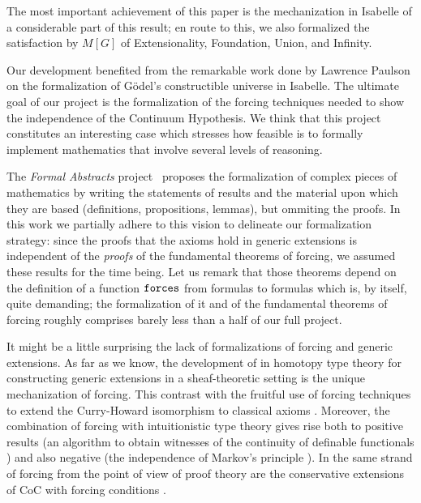\medskip
{}
\medskip

The most important achievement of this paper is the
mechanization in Isabelle of a considerable part of this result; en route
to this, we also formalized the satisfaction by $M[G]$ of
Extensionality, Foundation, Union, and Infinity. %

\medskip
{}
\medskip

Our development benefited from the remarkable work done by Lawrence
Paulson \cite{paulson_2003} on the formalization of G\"odel's
constructible universe in Isabelle. The
ultimate goal of our project is the formalization of the forcing
techniques needed to show the independence of the Continuum
Hypothesis. We think that this project constitutes an interesting case
which stresses how feasible is to formally implement mathematics that
involve several levels of reasoning. 

The \emph{Formal Abstracts} project~\cite{hales-fabstracts} proposes
the formalization of complex pieces of mathematics by writing the
statements of 
results and the material upon which they are based (definitions,
propositions, lemmas), but ommiting the proofs. In this work we
partially adhere to this vision to delineate our formalization
strategy:
since the proofs that the  axioms hold in generic extensions
is independent of the \emph{proofs} of the fundamental theorems of
forcing, we assumed these results for the time being. Let us remark
that those theorems depend on the definition of a function $\mathop{\mathtt{forces}}$
from formulas to formulas which is, by itself, quite demanding; the
formalization of it and of the fundamental theorems of forcing roughly
comprises barely less than a half of our full project.

It might be a little surprising the lack of formalizations of forcing
and generic extensions. As far as we know, the development of
\citet{JFR6232} in homotopy type theory for constructing generic
extensions in a sheaf-theoretic setting is the unique mechanization of
forcing. This contrast with the fruitful use of forcing techniques to
extend the Curry-Howard isomorphism to classical axioms
\cite{Miquel:2011:FPT:2058525.2059614,lmcs:1070}. Moreover, the
combination of forcing with intuitionistic type theory
\cite{Coquand:2009:FTT:1807662.1807665,coquand2010note} gives rise
both to positive results (an algorithm to obtain witnesses of the
continuity of definable functionals \cite{coquand2012computational})
and also negative (the independence of Markov's principle
\cite{lmcs:3859}). In the same strand of forcing from the point of
view of proof theory \cite{avigad_2004} are the conservative
extensions of CoC with forcing conditions
\cite{jaber:hal-01319066,Jaber:2012:ETT:2358958.2359524}.


